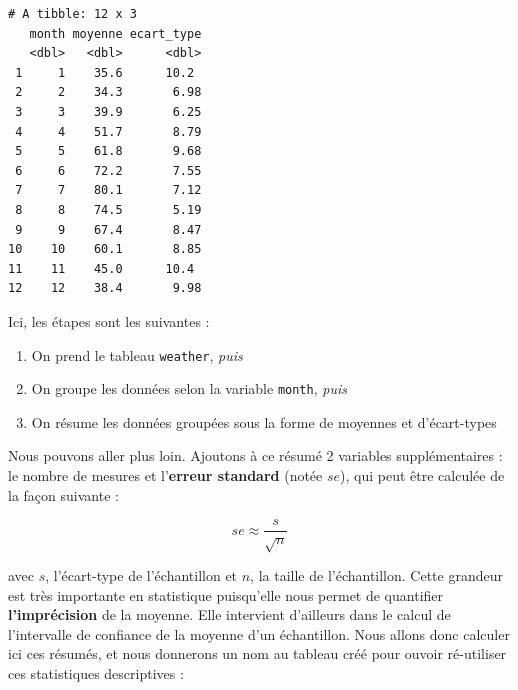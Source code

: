 \documentclass[a4paperpaper,]{article}
\newenvironment{Shaded}{\begin{snugshade}}{\end{snugshade}}
\newcommand{\DataTypeTok}[1]{\textcolor[rgb]{0.00,0.34,0.68}{#1}}
\newcommand{\KeywordTok}[1]{\textcolor[rgb]{0.12,0.11,0.11}{\textbf{#1}}}
\newcommand{\NormalTok}[1]{\textcolor[rgb]{0.12,0.11,0.11}{#1}}
\newcommand{\OperatorTok}[1]{\textcolor[rgb]{0.12,0.11,0.11}{#1}}
\newcommand{\OtherTok}[1]{\textcolor[rgb]{0.00,0.43,0.16}{#1}}
\newcommand{\StringTok}[1]{\textcolor[rgb]{0.75,0.01,0.01}{#1}}
\providecommand{\tightlist}{%
  \setlength{\itemsep}{0pt}\setlength{\parskip}{0pt}}
\theoremstyle{definition}
\theoremstyle{definition}
\theoremstyle{definition}
\theoremstyle{remark}
\begin{document}
\begin{Shaded}
\end{Shaded}

\begin{verbatim}
# A tibble: 12 x 3
   month moyenne ecart_type
   <dbl>   <dbl>      <dbl>
 1     1    35.6      10.2 
 2     2    34.3       6.98
 3     3    39.9       6.25
 4     4    51.7       8.79
 5     5    61.8       9.68
 6     6    72.2       7.55
 7     7    80.1       7.12
 8     8    74.5       5.19
 9     9    67.4       8.47
10    10    60.1       8.85
11    11    45.0      10.4 
12    12    38.4       9.98
\end{verbatim}

Ici, les étapes sont les suivantes :

\begin{enumerate}
\def\labelenumi{\arabic{enumi}.}
\tightlist
\item
  On prend le tableau \texttt{weather}, \emph{puis}
\item
  On groupe les données selon la variable \texttt{month}, \emph{puis}
\item
  On résume les données groupées sous la forme de moyennes et
  d'écart-types
\end{enumerate}

Nous pouvons aller plus loin. Ajoutons à ce résumé 2 variables
supplémentaires : le nombre de mesures et l'\textbf{erreur standard}
(notée \(se\)), qui peut être calculée de la façon suivante :

\[se \approx \frac{s}{\sqrt{n}}\]

avec \(s\), l'écart-type de l'échantillon et \(n\), la taille de
l'échantillon. Cette grandeur est très importante en statistique
puisqu'elle nous permet de quantifier \textbf{l'imprécision} de la
moyenne. Elle intervient d'ailleurs dans le calcul de l'intervalle de
confiance de la moyenne d'un échantillon. Nous allons donc calculer ici
ces résumés, et nous donnerons un nom au tableau créé pour ouvoir
ré-utiliser ces statistiques descriptives :
\end{document}
